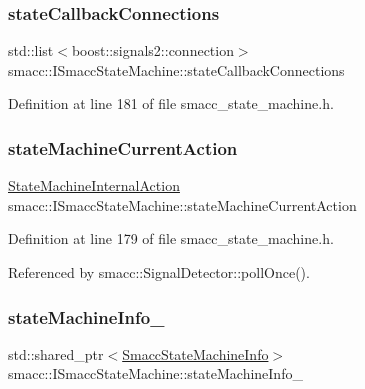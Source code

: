 \subsubsection{\texorpdfstring{state\+Callback\+Connections}{stateCallbackConnections}}
{\footnotesize\ttfamily std\+::list$<$boost\+::signals2\+::connection$>$ smacc\+::\+I\+Smacc\+State\+Machine\+::state\+Callback\+Connections\hspace{0.3cm}{\ttfamily [private]}}



Definition at line 181 of file smacc\+\_\+state\+\_\+machine.\+h.

\mbox{\label{classsmacc_1_1ISmaccStateMachine_a654a98ba86c4c1013ac3c371f293d950}} 
\subsubsection{\texorpdfstring{state\+Machine\+Current\+Action}{stateMachineCurrentAction}}
{\footnotesize\ttfamily \hyperlink{namespacesmacc_a0889aff43c93fe5285109819d2898144}{State\+Machine\+Internal\+Action} smacc\+::\+I\+Smacc\+State\+Machine\+::state\+Machine\+Current\+Action\hspace{0.3cm}{\ttfamily [private]}}



Definition at line 179 of file smacc\+\_\+state\+\_\+machine.\+h.



Referenced by smacc\+::\+Signal\+Detector\+::poll\+Once().

\mbox{\label{classsmacc_1_1ISmaccStateMachine_a0914aa27c3f51374c338d89a32b135d1}} 
\subsubsection{\texorpdfstring{state\+Machine\+Info\+\_\+}{stateMachineInfo\_}}
{\footnotesize\ttfamily std\+::shared\+\_\+ptr$<$\hyperlink{classsmacc_1_1introspection_1_1SmaccStateMachineInfo}{Smacc\+State\+Machine\+Info}$>$ smacc\+::\+I\+Smacc\+State\+Machine\+::state\+Machine\+Info\+\_\+\hspace{0.3cm}{\ttfamily [private]}}



